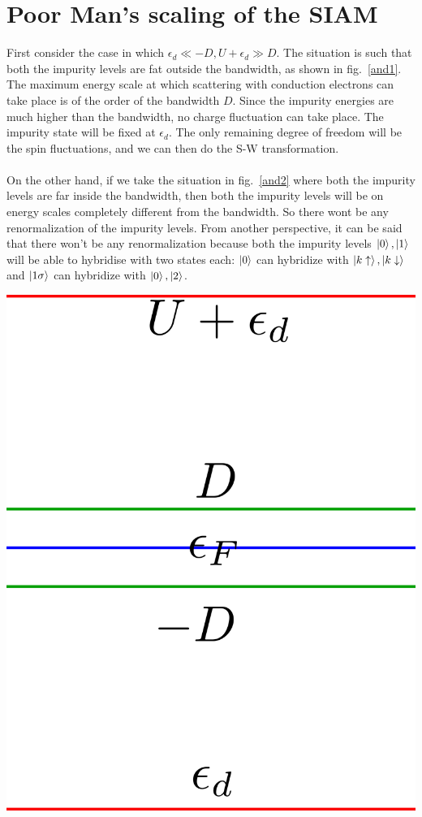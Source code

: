 \documentclass[twoside]{report}
\numberwithin{equation}{section}
\begin{document}
\section{Poor Man's scaling of the SIAM}
First consider the case in which \(\epsilon_d \ll -D, U+\epsilon_d \gg D\).
The situation is such that both the impurity levels are fat outside the bandwidth, as shown in fig.~\ref{and1}.
The maximum energy scale at which scattering with conduction electrons can take place is of the order of the bandwidth \(D\).
Since the impurity energies are much higher than the bandwidth, no charge fluctuation can take place.
The impurity state will be fixed at \(\epsilon_d\).
The only remaining degree of freedom will be the spin fluctuations, and we can then do the S-W transformation.\\\\
On the other hand, if we take the situation in fig.~\ref{and2} where both the impurity levels are far inside the bandwidth, then both the impurity levels will be on energy scales completely different from the bandwidth.
So there wont be any renormalization of the impurity levels.
From another perspective, it can be said that there won't be any renormalization because both the impurity levels \(\ket{0},\ket{1}\) will be able to hybridise with two states each: \(\ket{0}\) can hybridize with \(\ket{k\uparrow},\ket{k\downarrow}\) and \(\ket{1\sigma}\) can hybridize with \(\ket{0},\ket{2}\).
\begin{minipage}{0.45\textwidth}
    \centering
    \includegraphics[width=\textwidth]{../figures/anderson.png}
    \label{and1}
\end{minipage}
\end{document}
